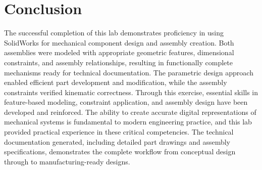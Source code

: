 \section{Conclusion}

The successful completion of this lab demonstrates proficiency in using SolidWorks for mechanical component design and assembly creation. Both assemblies were modeled with appropriate geometric features, dimensional constraints, and assembly relationships, resulting in functionally complete mechanisms ready for technical documentation. The parametric design approach enabled efficient part development and modification, while the assembly constraints verified kinematic correctness. Through this exercise, essential skills in feature-based modeling, constraint application, and assembly design have been developed and reinforced. The ability to create accurate digital representations of mechanical systems is fundamental to modern engineering practice, and this lab provided practical experience in these critical competencies. The technical documentation generated, including detailed part drawings and assembly specifications, demonstrates the complete workflow from conceptual design through to manufacturing-ready designs.

